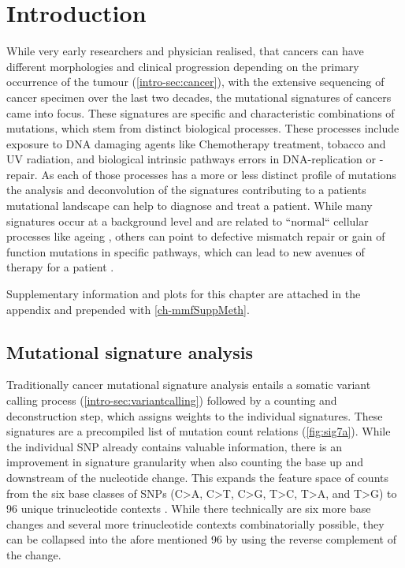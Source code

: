 \section{Introduction}
\label{mmf-sec:intro}

While very early researchers and physician realised, that cancers can have different morphologies and clinical progression depending on the primary occurrence of the tumour (\autoref{intro-sec:cancer}), with the extensive sequencing of cancer specimen over the last two decades, the mutational signatures of cancers came into focus. These signatures are specific and characteristic combinations of mutations, which stem from distinct biological processes. These processes include exposure to DNA damaging agents like Chemotherapy treatment, tobacco and UV radiation, and biological intrinsic pathways errors in DNA-replication or -repair. As each of those processes has a more or less distinct profile of mutations \cite{Hollstein1991,Kucab2019} the analysis and deconvolution of the signatures contributing to a patients mutational landscape can help to diagnose and treat a patient. While many signatures occur at a background level and are related to ``normal`` cellular processes like ageing \cite{Alexandrov2013}, others can point to defective mismatch repair or gain of function mutations in specific pathways, which can lead to new avenues of therapy for a patient \cite{Neil2017}.

Supplementary information and plots for this chapter are attached in the appendix and prepended with \ref{ch-mmfSuppMeth}.

\subsection{Mutational signature analysis}
\label{mmf-sec:signatureanalysis}
Traditionally cancer mutational signature analysis entails a somatic variant calling process (\autoref{intro-sec:variantcalling}) followed by a counting and deconstruction step, which assigns weights to the individual signatures. These signatures are a precompiled list of mutation count relations (\autoref{fig:sig7a}). While the individual SNP already contains valuable information, there is an improvement in signature granularity when also counting the base up and downstream of the nucleotide change. This expands the feature space of counts from the six base classes of SNPs (C>A, C>T, C>G, T>C, T>A, and T>G) to 96 unique trinucleotide contexts \cite{Alexandrov2013}. While there technically are six more base changes and several  more trinucleotide contexts combinatorially possible, they can be collapsed into the afore mentioned 96 by using the reverse complement of the change.


